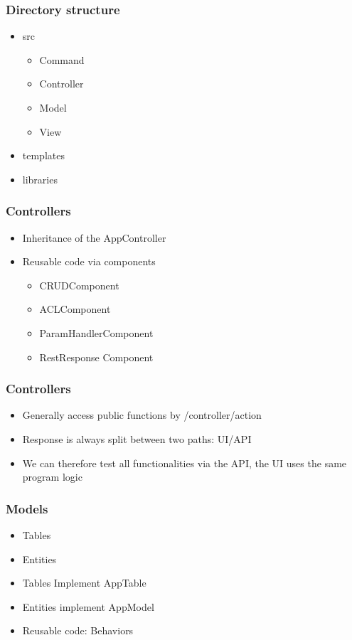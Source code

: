 \begin{frame}
	\frametitle{Directory structure}
	\begin{itemize}
            \item src
            \begin{itemize}
                \item Command
                \item Controller
                \item Model
                \item View
            \end{itemize}
            \item templates
            \item libraries
	\end{itemize}
\end{frame}

\begin{frame}
	\frametitle{Controllers}
	\begin{itemize}
            \item Inheritance of the AppController
            \item Reusable code via components
            \begin{itemize}
                \item CRUDComponent
                \item ACLComponent
                \item ParamHandlerComponent
                \item RestResponse Component
            \end{itemize}
	\end{itemize}
\end{frame}

\begin{frame}
	\frametitle{Controllers}
	\begin{itemize}
            \item Generally access public functions by /controller/action
            \item Response is always split between two paths: UI/API
            \item We can therefore test all functionalities via the API, the UI uses the same program logic
	\end{itemize}
\end{frame}


\begin{frame}
	\frametitle{Models}
	\begin{itemize}
		\item Tables
                \item Entities
                \item Tables Implement AppTable
                \item Entities implement AppModel
                \item Reusable code: Behaviors
	\end{itemize}
\end{frame}

